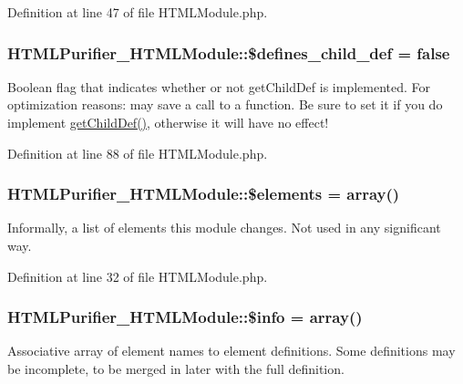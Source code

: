Definition at line 47 of file H\+T\+M\+L\+Module.\+php.

\hypertarget{classHTMLPurifier__HTMLModule_a6a249c0e393231a3c59d9b1f8ec897f0}{
\subsubsection[{\$defines\+\_\+child\+\_\+def}]{\setlength{\rightskip}{0pt plus 5cm}H\+T\+M\+L\+Purifier\+\_\+\+H\+T\+M\+L\+Module\+::\$defines\+\_\+child\+\_\+def = false}}\label{classHTMLPurifier__HTMLModule_a6a249c0e393231a3c59d9b1f8ec897f0}
Boolean flag that indicates whether or not get\+Child\+Def is implemented. For optimization reasons\+: may save a call to a function. Be sure to set it if you do implement \hyperlink{classHTMLPurifier__HTMLModule_a149d7faea904935ce1f32ef1634560c0}{get\+Child\+Def()}, otherwise it will have no effect! 

Definition at line 88 of file H\+T\+M\+L\+Module.\+php.

\hypertarget{classHTMLPurifier__HTMLModule_a55ba2bf877759995be201f4badb49fc8}{
\subsubsection[{\$elements}]{\setlength{\rightskip}{0pt plus 5cm}H\+T\+M\+L\+Purifier\+\_\+\+H\+T\+M\+L\+Module\+::\$elements = array()}}\label{classHTMLPurifier__HTMLModule_a55ba2bf877759995be201f4badb49fc8}
Informally, a list of elements this module changes. Not used in any significant way. 

Definition at line 32 of file H\+T\+M\+L\+Module.\+php.

\hypertarget{classHTMLPurifier__HTMLModule_a8993a9639004f7e706f63f65ee28254f}{
\subsubsection[{\$info}]{\setlength{\rightskip}{0pt plus 5cm}H\+T\+M\+L\+Purifier\+\_\+\+H\+T\+M\+L\+Module\+::\$info = array()}}\label{classHTMLPurifier__HTMLModule_a8993a9639004f7e706f63f65ee28254f}
Associative array of element names to element definitions. Some definitions may be incomplete, to be merged in later with the full definition. 

